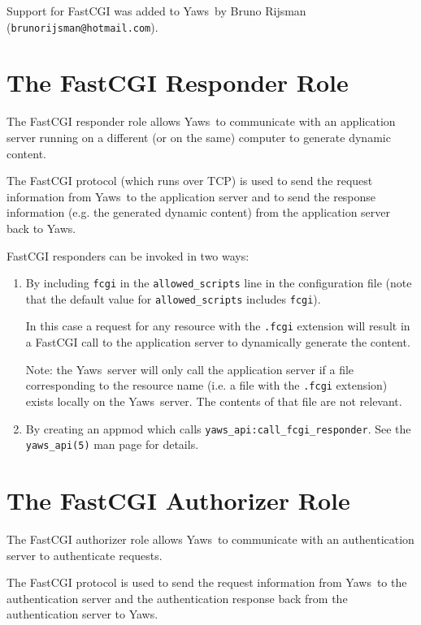 \documentclass[11pt,oneside,english]{book}
\newcommand{\Yaws}            %
        {{\sc Yaws}}
\begin{document}
Support for FastCGI was added to \Yaws\  by Bruno Rijsman
(\verb+brunorijsman@hotmail.com+).

\section{The FastCGI Responder Role}

The FastCGI responder role allows \Yaws\  to communicate with an
application server running on a different (or on the same) computer
to generate dynamic content.

The FastCGI protocol (which runs over TCP) is used to send the request
information from \Yaws\  to the application server and to send the
response information (e.g. the generated dynamic content) from
the application server back to \Yaws{}.

FastCGI responders can be invoked in two ways:

\begin{enumerate}

\item
By including \verb+fcgi+ in the \verb+allowed_scripts+ line
in the configuration file (note that the default value for
\verb+allowed_scripts+ includes \verb+fcgi+).

In this case a request for any resource with the \verb+.fcgi+
extension will result in a FastCGI call to the application server to
dynamically generate the content.

Note: the \Yaws\  server will only call the application server if a file
corresponding to the resource name (i.e. a file with the \verb+.fcgi+
extension) exists locally on the \Yaws\  server. The contents of that
file are not relevant.

\item
By creating an appmod which calls \verb+yaws_api:call_fcgi_responder+.
See the \verb+yaws_api(5)+ man page for details.

\end{enumerate}

\section{The FastCGI Authorizer Role}

The FastCGI authorizer role allows \Yaws\  to communicate with an
authentication server to authenticate requests.

The FastCGI protocol is used to send the request information from
\Yaws\ to the authentication server and the authentication response
back from the authentication server to \Yaws{}.
\end{document}
